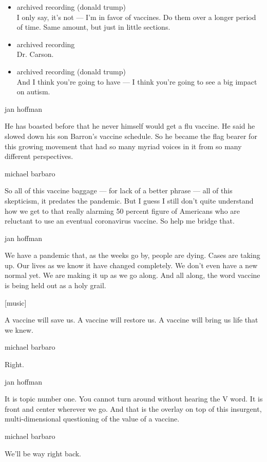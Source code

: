\begin{itemize}
\item
  archived recording (donald trump)\\
  I only say, it's not --- I'm in favor of vaccines. Do them over a
  longer period of time. Same amount, but just in little sections.
\item
  archived recording\\
  Dr. Carson.
\item
  archived recording (donald trump)\\
  And I think you're going to have --- I think you're going to see a big
  impact on autism.
\end{itemize}

jan hoffman

He has boasted before that he never himself would get a flu vaccine. He
said he slowed down his son Barron's vaccine schedule. So he became the
flag bearer for this growing movement that had so many myriad voices in
it from so many different perspectives.

michael barbaro

So all of this vaccine baggage --- for lack of a better phrase --- all
of this skepticism, it predates the pandemic. But I guess I still don't
quite understand how we get to that really alarming 50 percent figure of
Americans who are reluctant to use an eventual coronavirus vaccine. So
help me bridge that.

jan hoffman

We have a pandemic that, as the weeks go by, people are dying. Cases are
taking up. Our lives as we know it have changed completely. We don't
even have a new normal yet. We are making it up as we go along. And all
along, the word vaccine is being held out as a holy grail.

{[}music{]}

A vaccine will save us. A vaccine will restore us. A vaccine will bring
us life that we knew.

michael barbaro

Right.

jan hoffman

It is topic number one. You cannot turn around without hearing the V
word. It is front and center wherever we go. And that is the overlay on
top of this insurgent, multi-dimensional questioning of the value of a
vaccine.

michael barbaro

We'll be way right back.


